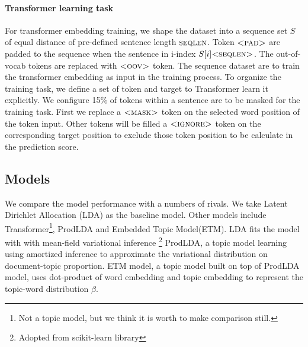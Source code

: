 \paragraph{Transformer learning task}\label{ch4:transformer_learning}
For transformer embedding training, we shape the dataset into a sequence set $ S $ of equal distance of pre-defined sentence length $ \textsc{seqlen} $. Token $ \textsc{<pad>} $ are padded to the sequence when the sentence in i-index $ S[i]\textsc{<seqlen>} $. The out-of-vocab tokens are replaced with $ \textsc{<oov>} $ token. The sequence dataset are to train the transformer embedding as input in the training process. To organize the training task, we define a set of token and target to Transformer learn it explicitly. We configure 15\% of tokens within a sentence are to be masked for the training task. First we replace a $ \textsc{<mask>} $ token on the selected word position of the token input. Other tokens will be filled a $ \textsc{<ignore>} $ token on the corresponding target position to exclude those token position to be calculate in the prediction score. 
\subsection{Models}\label{ch4:result_model}
We compare the model performance with a numbers of rivals. We take Latent Dirichlet Allocation (LDA)\cite{blei_latent_2003} as the baseline model. Other models include Transformer\cite{vaswani_attention_2017}\footnote{Not a topic model, but we think it is worth to make comparison still.},  ProdLDA\cite{srivastava_autoencoding_2017} and Embedded Topic Model(ETM)\cite{dieng_topic_2019}.
LDA fits the model with with mean-field variational inference \footnote{Adopted from \textmd{scikit-learn} library}
ProdLDA, a topic model learning using amortized inference to approximate the variational distribution on document-topic proportion.
ETM model, a topic model built on top of ProdLDA model, uses dot-product of word embedding and topic embedding to represent the topic-word distribution $ \beta $.
